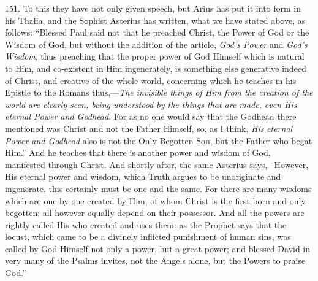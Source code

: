 151. To this they have not
only given speech, but Arius has put it into form in his Thalia, and
the Sophist Asterius has written, what we have stated above, as
follows: ``Blessed Paul said not that he preached Christ, the Power of
God or the Wisdom of God, but without the addition of the article, \emph{God's
Power} and \emph{God's Wisdom}, thus preaching that the proper
power of God Himself which is natural to Him, and co-existent in Him
ingenerately, is something else generative indeed of Christ, and
creative of the whole world, concerning which he teaches in his
Epistle to the Romans thus,—\emph{The invisible things of Him from the
creation of the world are clearly seen, being understood by the things
that are made, even His eternal Power and Godhead}. For as no one
would say that the Godhead there mentioned was Christ and not the
Father Himself, so, as I think, \emph{His} \emph{eternal Power and
Godhead} also is not the Only Begotten Son, but the Father who
begat Him.'' And he teaches that there is another power and wisdom of
God, manifested through Christ. And shortly after, the same Asterius
says, ``However, His eternal power and wisdom, which Truth argues to be
unoriginate and ingenerate, this certainly must be one and the same.
For there are many wisdoms which are one by one created by Him, of
whom Christ is the first-born and only-begotten; all however equally
depend on their possessor. And all the powers are rightly called His
who created and uses them: as the Prophet says that the locust, which
came to be a divinely inflicted punishment of human sins, was called
by God Himself not only a power, but a great power; and blessed David
in very many of the Psalms invites, not the Angels alone, but the
Powers to praise God.''

